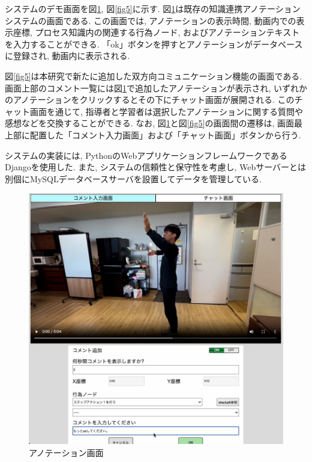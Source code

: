 システムのデモ画面を図\ref{fig4}, 図\ref{fig5}に示す. 図\ref{fig4}は既存の知識連携アノテーションシステムの画面である. この画面では, アノテーションの表示時間, 動画内での表示座標, プロセス知識内の関連する行為ノード, およびアノテーションテキストを入力することができる. 「ok」ボタンを押すとアノテーションがデータベースに登録され, 動画内に表示される.

図\ref{fig5}は本研究で新たに追加した双方向コミュニケーション機能の画面である. 画面上部のコメント一覧には図\ref{fig4}で追加したアノテーションが表示され, いずれかのアノテーションをクリックするとその下にチャット画面が展開される. このチャット画面を通じて, 指導者と学習者は選択したアノテーションに関する質問や感想などを交換することができる. なお, 図\ref{fig4}と図\ref{fig5}の画面間の遷移は, 画面最上部に配置した「コメント入力画面」および「チャット画面」ボタンから行う.

システムの実装には, PythonのWebアプリケーションフレームワークであるDjangoを使用した. また, システムの信頼性と保守性を考慮し, Webサーバーとは別個にMySQLデータベースサーバを設置してデータを管理している.

\begin{figure}[htbp]
    \centering
    \includegraphics[width=1.0\linewidth]{./image/demo_annotation.jpg}
    \caption{アノテーション画面}
    \label{fig4}
\end{figure}

